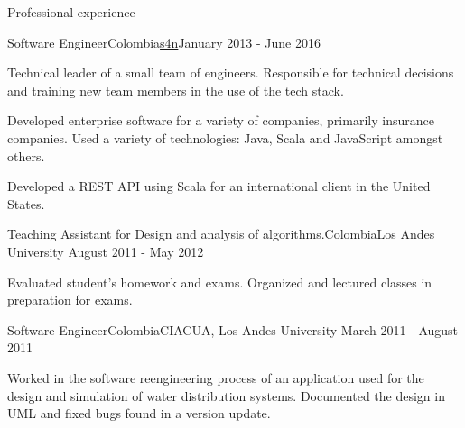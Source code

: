 \documentclass{resume} %
\def\uniandes{Los Andes University }
\begin{document}
\begin{rSection}{Professional experience}
\begin{rSubsection}{Software Engineer}{Colombia}{\href{https://www.s4n.co/}{s4n}}{January 2013 - June 2016}
\begin{rList}
\item Technical leader of a small team of engineers. Responsible for technical decisions and training new team members in the use of the tech stack.
\item Developed enterprise software for a variety of companies, primarily insurance companies. Used a variety of technologies: Java, Scala and JavaScript amongst others.
\item Developed a REST API using Scala for an international client in the United States.
\end{rList}
\end{rSubsection}


\begin{rSubsection}{Teaching Assistant for Design and analysis of algorithms.}{Colombia}{\uniandes}{August 2011 - May 2012}
\begin{rList}
\item Evaluated student’s homework and exams. Organized and lectured classes in preparation for exams.
\end{rList}
\end{rSubsection}


\begin{rSubsection}{Software Engineer}{Colombia}{CIACUA, \uniandes}{March 2011 - August 2011}
\begin{rList}
\item Worked in the software reengineering process of an application used for the design and simulation of water distribution systems. Documented the design in UML and fixed bugs found in a version update.
\end{rList}
\end{rSubsection}

\end{rSection}
\end{document}
